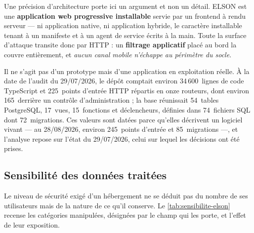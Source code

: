 Une précision d'architecture porte ici un argument et non un détail. ELSON est une
\textbf{application web progressive installable} servie par un frontend à rendu serveur --- ni
application native, ni application hybride, le caractère installable tenant à un manifeste et à
un agent de service écrits à la main. Toute la surface d'attaque transite donc par HTTP : un
\textbf{filtrage applicatif} placé au bord la couvre entièrement, et \emph{aucun canal mobile
n'échappe au périmètre du socle}.

Il ne s'agit pas d'un prototype mais d'une application en exploitation réelle. À la date de
l'audit du 29/07/2026, le dépôt comptait environ 34\,600~lignes de code TypeScript et
225~points d'entrée HTTP répartis en onze routeurs, dont environ 165~derrière un contrôle
d'administration ; la base réunissait 54~tables PostgreSQL, 17~vues, 15~fonctions et
déclencheurs, définies dans 74~fichiers SQL dont 72~migrations. Ces valeurs sont datées parce
qu'elles décrivent un logiciel vivant --- au 28/08/2026, environ 245~points d'entrée et
85~migrations ---, et l'analyse repose sur l'état du 29/07/2026, celui sur lequel les décisions
ont été prises.

\subsection{Sensibilité des données traitées}
\label{subsec:donnees-sensibles}

Le niveau de sécurité exigé d'un hébergement ne se déduit pas du nombre de ses utilisateurs mais
de la nature de ce qu'il conserve. Le \cref{tab:sensibilite-elson} recense les catégories
manipulées, désignées par le champ qui les porte, et l'effet de leur exposition.

